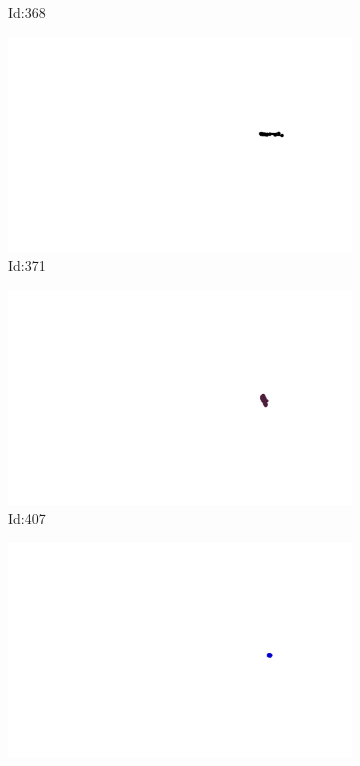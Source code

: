 \documentclass[12pt,twoside]{report}
\begin{document}
\begin{figure}
\begin{subfigure}[b]{0.20\textwidth}
\caption{Id:368}
\end{subfigure}
\begin{subfigure}[b]{0.20\textwidth}
\centering
\includegraphics[width=\textwidth]{../trajectories/371.png}
\caption{Id:371}
\end{subfigure}
\begin{subfigure}[b]{0.20\textwidth}
\centering
\includegraphics[width=\textwidth]{../trajectories/407.png}
\caption{Id:407}
\end{subfigure}
\begin{subfigure}[b]{0.20\textwidth}
\centering
\includegraphics[width=\textwidth]{../trajectories/417.png}

\end{subfigure}
\end{figure}
\end{document}
